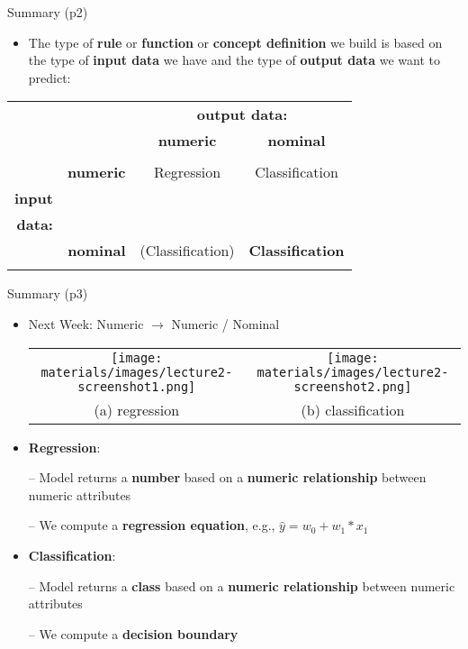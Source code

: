 \documentclass[handout]{beamer}
\newcommand{\strong}[1]{\textbf{\color{teal} #1}}
\newcommand{\stronger}[1]{\textbf{\color{purple} #1}}
\begin{document}
\begin{frame}[fragile]{Summary (p2)}
\begin{itemize}
\item The type of \stronger{rule} or \stronger{function} or \stronger{concept definition} we build is based on the type of \textbf{input data} we have and the type of \textbf{output data} we want to predict:
\end{itemize}
\begin{center}
\begin{tabular}{rr||c|c|}
 & & \multicolumn{2}{|c|}{\textbf{output data:}} \\
 & & \strong{numeric} & \strong{nominal} \\
\hline
\hline
& & & \\
& \strong{numeric} & {\color{lightgrey} Regression}  & {\color{lightgrey} Classification} \\
\textbf{input} & & & \\
\cline{2-4}
\textbf{data:} & & & \\
& \strong{nominal} & {\color{lightgrey} (Classification)} & \stronger{Classification} \\
& & & \\
\hline
\end{tabular}
\end{center}
\end{frame}
\begin{frame}{Summary (p3)}
\begin{itemize}
\item Next Week: Numeric $\rightarrow$ Numeric / Nominal
\begin{center}
\begin{tabular}{cc}
\texttt{[image: materials/images/lecture2-screenshot1.png]} &
\texttt{[image: materials/images/lecture2-screenshot2.png]} \\
(a) regression &
(b) classification \\
\end{tabular}
\end{center}
\item \stronger{Regression}:
\item[--] Model returns a \strong{number} based on a \strong{numeric relationship} between numeric attributes
\item[--] We compute a \stronger{regression equation}, e.g., $\hat{y} = w_0 + w_1 * x_1$
\item \stronger{Classification}:
\item[--] Model returns a \strong{class} based on a \strong{numeric relationship} between numeric attributes
\item[--] We compute a \strong{decision boundary}
\end{itemize}
\end{frame}
\end{document}
